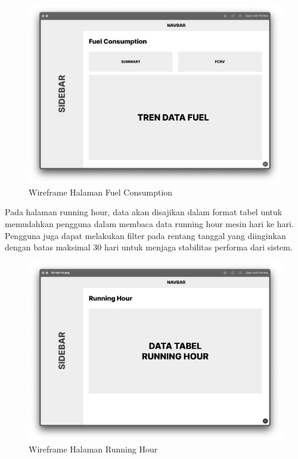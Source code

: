 \begin{figure}[!h]
    \includegraphics[width=1.05\linewidth, center]{images/hasil/iterations/2/lofi-fc.png}
    \caption{Wireframe Halaman Fuel Consumption}
    \label{fig:lofi-fc}
\end{figure}

Pada halaman running hour, data akan disajikan dalam format tabel untuk memudahkan pengguna dalam membaca data running hour mesin hari ke hari. Pengguna juga dapat melakukan filter pada rentang tanggal yang diinginkan dengan batas maksimal 30 hari untuk menjaga stabilitas performa dari sistem.

\begin{figure}[!h]
    \includegraphics[width=1.05\linewidth, center]{images/hasil/iterations/2/lofi-rh.png}
    \caption{Wireframe Halaman Running Hour}
    \label{fig:lofi-rh}
\end{figure}

